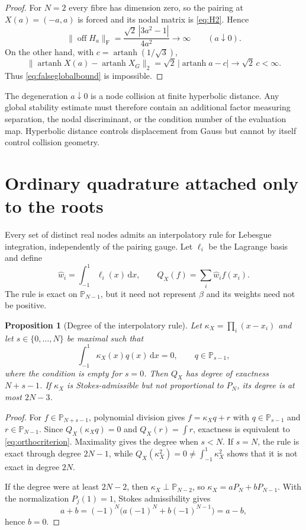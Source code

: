 \documentclass[11pt,a4paper]{article}
\newtheorem{proposition}[theorem]{Proposition}
\theoremstyle{definition}
\theoremstyle{remark}
\newcommand{\Pp}{\mathbb{P}}
\newcommand{\dd}{\,\mathrm{d}}
\begin{document}
\begin{proof}
For $N=2$ every fibre has dimension zero, so the pairing at $X(a)=(-a,a)$ is forced and its
nodal matrix is \eqref{eq:H2}.  Hence
\[
 \|\operatorname{off}H_a\|_{\mathrm F}
 =\frac{\sqrt2\,|3a^2-1|}{4a^2}\longrightarrow\infty
 \qquad(a\downarrow0).
\]
On the other hand, with $c=\operatorname{artanh}(1/\sqrt3)$,
\[
 \|\operatorname{artanh}X(a)-\operatorname{artanh}X_G\|_2
 =\sqrt2\,|\operatorname{artanh}a-c|\longrightarrow\sqrt2\,c<\infty.
\]
Thus \eqref{eq:falseglobalbound} is impossible.
\end{proof}

The degeneration $a\downarrow0$ is a node collision at finite hyperbolic distance.  Any
global stability estimate must therefore contain an additional factor measuring separation,
the nodal discriminant, or the condition number of the evaluation map.  Hyperbolic distance
controls displacement from Gauss but cannot by itself control collision geometry.

\section{Ordinary quadrature attached only to the roots}

Every set of distinct real nodes admits an interpolatory rule for Lebesgue integration,
independently of the pairing gauge.  Let $\ell_i$ be the Lagrange basis and define
\begin{equation}\label{eq:interpweights}
 \widehat w_i=\int_{-1}^{1}\ell_i(x)\dd x,
 \qquad
 Q_X(f)=\sum_i\widehat w_i f(x_i).
\end{equation}
The rule is exact on $\Pp_{N-1}$, but it need not represent $\beta$ and its weights need not
be positive.

\begin{proposition}[Degree of the interpolatory rule]\label{prop:degree}
Let $\kappa_X=\prod_i(x-x_i)$ and let $s\in\{0,\ldots,N\}$ be maximal such that
\begin{equation}\label{eq:orthocriterion}
 \int_{-1}^{1}\kappa_X(x)q(x)\dd x=0,
 \qquad q\in\Pp_{s-1},
\end{equation}
where the condition is empty for $s=0$.  Then $Q_X$ has degree of exactness
$N+s-1$.  If $\kappa_X$ is Stokes-admissible but not proportional to $P_N$, its degree is at
most $2N-3$.
\end{proposition}

\begin{proof}
For $f\in\Pp_{N+s-1}$, polynomial division gives
$f=\kappa_Xq+r$ with $q\in\Pp_{s-1}$ and $r\in\Pp_{N-1}$.  Since $Q_X(\kappa_Xq)=0$ and
$Q_X(r)=\int r$, exactness is equivalent to \eqref{eq:orthocriterion}.  Maximality gives the
degree when $s<N$.  If $s=N$, the rule is exact through degree $2N-1$, while
$Q_X(\kappa_X^2)=0\neq\int_{-1}^{1}\kappa_X^2$ shows that it is not exact in degree $2N$.

If the degree were at least $2N-2$, then $\kappa_X\perp\Pp_{N-2}$, so
$\kappa_X=aP_N+bP_{N-1}$.  With the normalization $P_j(1)=1$, Stokes admissibility gives
\[
 a+b=(-1)^N\bigl(a(-1)^N+b(-1)^{N-1}\bigr)=a-b,
\]
hence $b=0$.
\end{proof}
\end{document}

